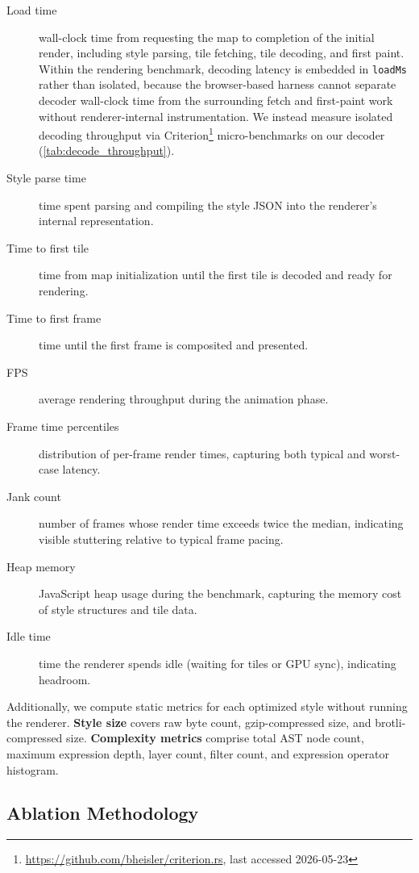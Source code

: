 \begin{description}
    \item[Load time] wall-clock time from requesting the map to completion of the initial render, including style parsing, tile fetching, tile decoding, and first paint.
    Within the rendering benchmark, decoding latency is embedded in \texttt{loadMs} rather than isolated, because the browser-based harness cannot separate decoder wall-clock time from the surrounding fetch and first-paint work without renderer-internal instrumentation.
    We instead measure isolated decoding throughput via Criterion\footnote{\url{https://github.com/bheisler/criterion.rs}, last accessed 2026-05-23} micro-benchmarks on our decoder (\cref{tab:decode_throughput}).
    \item[Style parse time] time spent parsing and compiling the style \ac{JSON} into the renderer's internal representation.
    \item[Time to first tile] time from map initialization until the first tile is decoded and ready for rendering.
    \item[Time to first frame] time until the first frame is composited and presented.
    \item[\ac{FPS}] average rendering throughput during the animation phase.
    \item[Frame time percentiles] distribution of per-frame render times, capturing both typical and worst-case latency.
    \item[Jank count] number of frames whose render time exceeds twice the median, indicating visible stuttering relative to typical frame pacing.
    \item[Heap memory] JavaScript heap usage during the benchmark, capturing the memory cost of style structures and tile data.
    \item[Idle time] time the renderer spends idle (waiting for tiles or \ac{GPU} sync), indicating headroom.
\end{description}

\noindent Additionally, we compute static metrics for each optimized style without running the renderer.
\textbf{Style size} covers raw byte count, gzip-compressed size, and brotli-compressed size.
\textbf{Complexity metrics} comprise total \ac{AST} node count, maximum expression depth, layer count, filter count, and expression operator histogram.

\subsection{Ablation Methodology}\label{sub:ablation}

